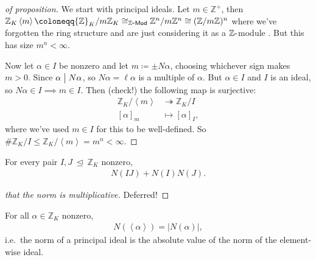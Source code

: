 \begin{proof}[of proposition]

We start with principal ideals. Let \(m\in {\mathbb{Z}}^+\), then
\({\mathbb{Z}}_K \left\langle{ m }\right\rangle \coloneqq{\mathbb{Z}}_K /m {\mathbb{Z}}_K \cong_{{\mathbb{Z}{\hbox{-}}\mathsf{Mod}}} {\mathbb{Z}}^n / m{\mathbb{Z}}^n \cong ({\mathbb{Z}}/m{\mathbb{Z}})^n\)
where we've forgotten the ring structure and are just considering it as
a \({\mathbb{Z}}{\hbox{-}}\)module . But this has size \(m^n < \infty\).

Now let \(\alpha\in I\) be nonzero and let \(m \coloneqq\pm N \alpha\),
choosing whichever sign makes \(m>0\). Since \(\alpha\bigm|N \alpha\),
so \(N \alpha = \ell \alpha\) is a multiple of \(\alpha\). But
\(\alpha\in I\) and \(I\) is an ideal, so
\(N \alpha\in I \implies m \in I\). Then (check!) the following map is
surjective:
\begin{align*}
{\mathbb{Z}}_K/ \left\langle{ m }\right\rangle &\twoheadrightarrow{\mathbb{Z}}_K/I \\
[ \alpha]_m &\mapsto [ \alpha]_I
,\end{align*}
where we've used \(m\in I\) for this to be well-defined. So
\(\# {\mathbb{Z}}_K /I \leq {\mathbb{Z}}_K / \left\langle{ m }\right\rangle = m^n < \infty\).

\end{proof}

\begin{theorem}

For every pair \(I, J{~\trianglelefteq~}{\mathbb{Z}}_K\) nonzero,
\begin{align*}
N( IJ) + N(I) N(J)
.\end{align*}

\end{theorem}

\begin{proof}[that the norm is multiplicative]

Deferred!

\end{proof}

\begin{theorem}

For all \(\alpha\in {\mathbb{Z}}_K\) nonzero,
\begin{align*}
N( \left\langle{ \alpha }\right\rangle) = {\left\lvert { N ( \alpha ) } \right\rvert}
,\end{align*}
i.e.~the norm of a principal ideal is the absolute value of the norm of
the element-wise ideal.

\end{theorem}

